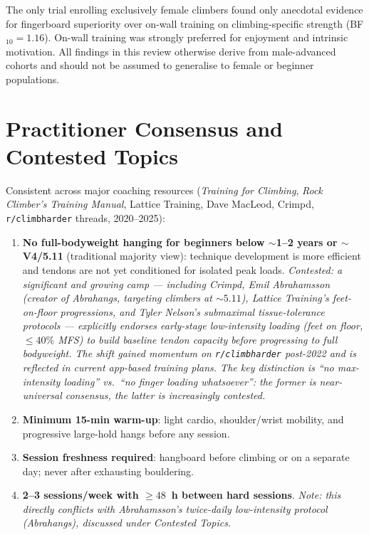 \documentclass[12pt,a4paper]{article}
\begin{document}
The only trial enrolling exclusively female climbers \cite{langer2024} found only anecdotal evidence for fingerboard superiority over on-wall training on climbing-specific strength (BF$_{10}=1.16$). On-wall training was strongly preferred for enjoyment and intrinsic motivation. All findings in this review otherwise derive from male-advanced cohorts and should not be assumed to generalise to female or beginner populations.

\section{Practitioner Consensus and Contested Topics}
\label{sec:folklore}

\begin{folklorebox}[title=Practitioner Consensus --- Majority Agreement]
Consistent across major coaching resources (\textit{Training for Climbing}, \textit{Rock Climber's Training Manual}, Lattice Training, Dave MacLeod, Crimpd, \texttt{r/climbharder} threads, 2020--2025):
\begin{enumerate}[noitemsep, topsep=2pt]
  \item \textbf{No full-bodyweight hanging for beginners below ${\sim}$1--2 years or ${\sim}$V4/5.11} (traditional majority view): technique development is more efficient and tendons are not yet conditioned for isolated peak loads. \textit{Contested: a significant and growing camp — including Crimpd, Emil Abrahamsson (creator of Abrahangs, targeting climbers at ${\sim}5.11$), Lattice Training's feet-on-floor progressions, and Tyler Nelson's submaximal tissue-tolerance protocols — explicitly endorses early-stage low-intensity loading (feet on floor, $\leq40\%$ MFS) to build baseline tendon capacity before progressing to full bodyweight. The shift gained momentum on \texttt{r/climbharder} post-2022 and is reflected in current app-based training plans. The key distinction is ``no max-intensity loading'' vs.\ ``no finger loading whatsoever'': the former is near-universal consensus, the latter is increasingly contested.}
  \item \textbf{Minimum 15-min warm-up}: light cardio, shoulder/wrist mobility, and progressive large-hold hangs before any session.
  \item \textbf{Session freshness required}: hangboard before climbing or on a separate day; never after exhausting bouldering.
  \item \textbf{2--3 sessions/week with $\geq48$~h between hard sessions}. \textit{Note: this directly conflicts with Abrahamsson's twice-daily low-intensity protocol (Abrahangs), discussed under Contested Topics.}

\end{enumerate}
\end{folklorebox}
\end{document}
